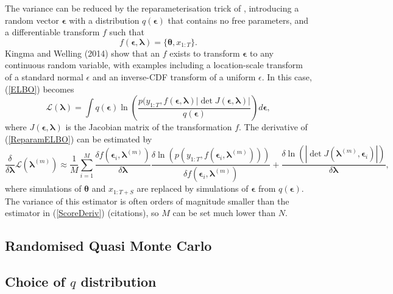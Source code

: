 \documentclass[12pt,a4paper]{article}%
\numberwithin{equation}{section}
\begin{document}
The variance can be reduced by the reparameterisation trick of \citet{Kingma2014}, introducing a random vector $\boldsymbol{\epsilon}$ with a distribution $q(\boldsymbol{\epsilon})$ that contains no free parameters, and a differentiable transform $f$ such that
\begin{equation}
\label{Reparam}
f(\boldsymbol{\epsilon}, \boldsymbol{\lambda}) = \{\boldsymbol{\theta}, x_{1:T}\}.
\end{equation}
Kingma and Welling (2014) show that an $f$ exists to transform $\boldsymbol{\epsilon}$ to any continuous random variable, with examples including a location-scale transform of a standard normal $\epsilon$ and an inverse-CDF transform of a uniform $\epsilon$. In this case, (\ref{ELBO}) becomes
\begin{equation}
\label{ReparamELBO}
\mathcal{L}(\boldsymbol{\lambda}) = \int q(\boldsymbol{\epsilon}) \ln \left( \frac{p(y_{1:T},f(\boldsymbol{\epsilon}, \boldsymbol{\lambda}) |\det J(\boldsymbol{\epsilon}, \boldsymbol{\lambda})|}{q(\boldsymbol{\epsilon})} \right) d\boldsymbol{\epsilon},
\end{equation}
where $J(\boldsymbol{\epsilon}, \boldsymbol{\lambda})$ is the Jacobian matrix of the transformation $f$. The derivative of (\ref{ReparamELBO}) can be estimated by 
\begin{equation}
\label{ReparamDeriv}
\frac{\delta}{\delta \boldsymbol{\lambda}}\mathcal{L}(\boldsymbol{\lambda}^{(m)}) \approx \frac{1}{M}\sum_{i=1}^{M}
\frac{\delta f(\boldsymbol{\epsilon}_i, \boldsymbol{\lambda}^{(m)})} {\delta \boldsymbol{\lambda}}
\frac{\delta \ln (p(y_{1:T}, f(\boldsymbol{\epsilon}_i, \boldsymbol{\lambda}^{(m)})))}{\delta f(\boldsymbol{\epsilon}_i, \boldsymbol{\lambda}^{(m)})} + \frac{\delta  \ln(|\det J(\boldsymbol{\lambda}^{(m)}, \boldsymbol{\epsilon}_i)|)}{\delta \boldsymbol{\lambda}},
\end{equation} 
where simulations of $\boldsymbol{\theta}$ and $x_{1:T+S}$ are replaced by simulations of $\boldsymbol{\epsilon}$ from $q(\boldsymbol{\epsilon})$. The variance of this estimator is often orders of magnitude smaller than the estimator in (\ref{ScoreDeriv}) (citations), so $M$ can be set much lower than $N$.

\subsection{Randomised Quasi Monte Carlo}
\citep{Gunawan2017}
\citep{Matousek1998}
\citep{Bratley1988}
\citep{Sobol1967}

\subsection{Choice of $q$ distribution}
\end{document}
